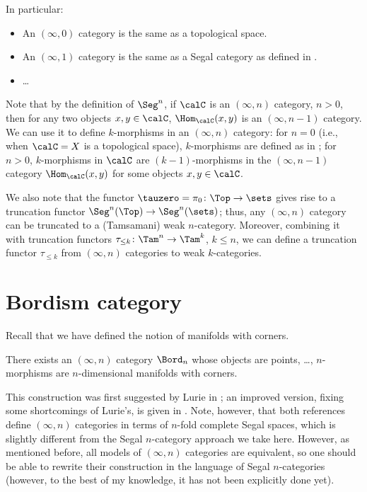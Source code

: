 In particular:
\begin{itemize}
  \item An $(\infty, 0)$ category is the same as a topological space.
  \item An $(\infty, 1)$ category is the same as a Segal category as defined
    in .
  \item \dots
\end{itemize}

Note that by the definition of $\Seg^n$, if $\calC$ is an $(\infty, n)$
category, $n>0$, then for any two objects $x,y\in \calC$, $\Hom_\calC(x,y)$ is
an $(\infty, n-1)$ category. We can use it to define $k$-morphisms in an
$(\infty, n)$ category: for $n=0$ (i.e., when $\calC=X$ is a topological space),
$k$-morphisms are defined as in ; for $n>0$,
$k$-morphisms in $\calC$ are $(k-1)$-morphisms in the $(\infty, n-1)$ category
$\Hom_{\calC}(x,y)$ for some objects $x,y\in \calC$.

We also note that the functor $\tauzero=\pi_0\colon \Top\to\sets$ gives rise to
a truncation functor $\Seg^n(\Top)\to \Seg^n(\sets)$; thus, any $(\infty, n)$
category can be truncated to a (Tamsamani) weak $n$-category. Moreover,
combining it with truncation functors $\tau_{\leq k}\colon \Tam^n\to \Tam^k$, $k
\le n$, we can define a truncation functor $\tau_{\leq k}$ from $(\infty, n)$
categories to weak $k$-categories.

\section{Bordism category}\label{s:bordn-highercat}
Recall that we have defined the notion of manifolds with corners.

\begin{theorem}\label{t:bordn-highercat}
  There exists an $(\infty, n)$ category $\Bord_n$ whose objects are points,
  \dots, $n$-morphisms are $n$-dimensional manifolds with corners.
\end{theorem}
This construction was first suggested by Lurie in ; an
improved version, fixing some shortcomings of Lurie's, is given in
. Note, however, that both references define $(\infty, n)$
categories in terms of $n$-fold complete Segal spaces, which is slightly
different from the Segal $n$-category approach we take here. However, as
mentioned before, all models of $(\infty, n)$ categories are equivalent, so one
should be able to rewrite their construction in the language of Segal
$n$-categories (however, to the best of my knowledge, it has not been explicitly
done yet).


\clearpage